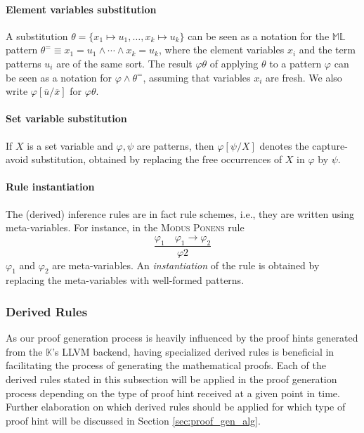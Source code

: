 \documentclass{article}
\theoremstyle{plain}
\theoremstyle{definition}
\newcommand{\K}{$\mathbb{K}$\xspace}
\newcommand{\ML}{$\mathbb{ML}$\xspace}
\begin{document}
\paragraph{Element variables substitution\\}

A substitution $\theta = \{x_1\mapsto u_1,\ldots,x_k\mapsto u_k\}$ can be seen as a notation for the \ML pattern $\theta^= \equiv x_1=u_1\land\cdots\land x_k=u_k$, where the element variables $x_i$ and the term patterns $u_i$ are of the same sort. The result $\varphi\theta$ of applying $\theta$ to a pattern $\varphi$ can be seen as a notation for $\varphi\land \theta^=$, assuming that variables $x_i$ are fresh. We also write $\varphi[\overline{u}/
\overline{x}]$ for $\varphi\theta$.

\paragraph{Set variable substitution\\}
If $X$ is a set variable and $\varphi, \psi$ are patterns, then $\varphi[\psi/X]$ denotes the capture-avoid substitution, obtained by replacing the free occurrences of $X$ in $\varphi$ by $\psi$.

\paragraph{Rule instantiation\\} The (derived) inference rules are in fact rule schemes, i.e., they are written using meta-variables. For instance, in the \textsc{Modus Ponens} rule
\[
\dfrac{\varphi_1\quad \varphi_1\rightarrow \varphi_2}
{\varphi2}
\]
$\varphi_1$ and $\varphi_2$ are meta-variables. An \emph{instantiation} of the rule is obtained by replacing the meta-variables with well-formed patterns.


\subsubsection{Derived Rules}

As our proof generation process is heavily influenced by the proof hints generated from the \K's LLVM backend, having specialized derived rules is beneficial in facilitating the process of generating the mathematical proofs. Each of the derived rules stated in this subsection will be applied in the proof generation process depending on the type of proof hint received at a given point in time. Further elaboration on which derived rules should be applied for which type of proof hint will be discussed in Section \ref{sec:proof_gen_alg}.
\end{document}

